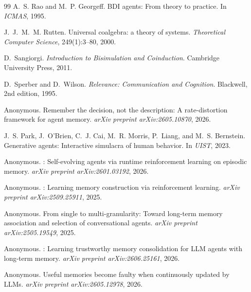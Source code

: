 \documentclass{article}
\begin{document}
\begin{thebibliography}{99}
A.~S. Rao and M.~P. Georgeff.
\newblock BDI agents: From theory to practice.
\newblock In \emph{ICMAS}, 1995.

J.~J.~M.~M. Rutten.
\newblock Universal coalgebra: a theory of systems.
\newblock \emph{Theoretical Computer Science}, 249(1):3--80, 2000.

D.~Sangiorgi.
\newblock \emph{Introduction to Bisimulation and Coinduction}.
\newblock Cambridge University Press, 2011.

D.~Sperber and D.~Wilson.
\newblock \emph{Relevance: Communication and Cognition}.
\newblock Blackwell, 2nd edition, 1995.

Anonymous.
\newblock Remember the decision, not the description: A
rate-distortion framework for agent memory.
\newblock \emph{arXiv preprint arXiv:2605.10870}, 2026.

J.~S. Park, J.~O'Brien, C.~J. Cai, M.~R. Morris, P.~Liang, and
M.~S. Bernstein.
\newblock Generative agents: Interactive simulacra of human behavior.
\newblock In \emph{UIST}, 2023.

Anonymous.
: Self-evolving agents via runtime reinforcement
learning on episodic memory.
\newblock \emph{arXiv preprint arXiv:2601.03192}, 2026.

Anonymous.
: Learning memory construction via
reinforcement learning.
\newblock \emph{arXiv preprint arXiv:2509.25911}, 2025.

Anonymous.
\newblock From single to multi-granularity: Toward long-term memory
association and selection of conversational agents.
\newblock \emph{arXiv preprint arXiv:2505.19549}, 2025.

Anonymous.
: Learning trustworthy memory consolidation for
{LLM} agents with long-term memory.
\newblock \emph{arXiv preprint arXiv:2606.25161}, 2026.

Anonymous.
\newblock Useful memories become faulty when continuously updated by
{LLMs}.
\newblock \emph{arXiv preprint arXiv:2605.12978}, 2026.
\end{thebibliography}
\end{document}
